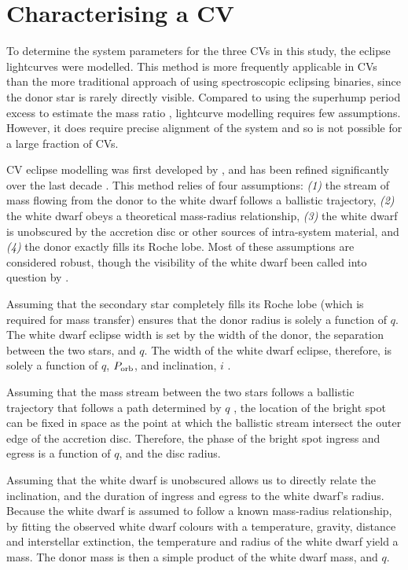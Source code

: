 \section{Characterising a CV}\label{sect:method:lightcurve modelling}

To determine the system parameters for the three CVs in this study, the eclipse lightcurves were modelled. This method is more frequently applicable in CVs than the more traditional approach of using spectroscopic eclipsing binaries, since the donor star is rarely directly visible. Compared to using the superhump period excess to estimate the mass ratio \citep{patterson2005, knigge2006}, lightcurve modelling requires few assumptions. However, it does require precise alignment of the system and so is not possible for a large fraction of CVs.

CV eclipse modelling was first developed by \citet{wood1986}, and has been refined significantly over the last decade \citep{Savoury2011, McAllister2017, McAllister2019}. This method relies of four assumptions: \textit{(1)} the stream of mass flowing from the donor to the white dwarf follows a ballistic trajectory, \textit{(2)} the white dwarf obeys a theoretical mass-radius relationship, \textit{(3)} the white dwarf is unobscured by the accretion disc or other sources of intra-system material, and \textit{(4)} the donor exactly fills its Roche lobe. Most of these assumptions are considered robust, though the visibility of the white dwarf been called into question by \citet{Spark2015}.

Assuming that the secondary star completely fills its Roche lobe (which is required for mass transfer) ensures that the donor radius is solely a function of $q$. The white dwarf eclipse width is set by the width of the donor, the separation between the two stars, and $q$. The width of the white dwarf eclipse, therefore, is solely a function of $q$, $P_{\rm orb}$, and inclination, $i$ \citep{bailey1979}.

Assuming that the mass stream between the two stars follows a ballistic trajectory that follows a path determined by $q$ \citep{Lubow1975}, the location of the bright spot can be fixed in space as the point at which the ballistic stream intersect the outer edge of the accretion disc. Therefore, the phase of the bright spot ingress and egress is a function of $q$, and the disc radius.

Assuming that the white dwarf is unobscured allows us to directly relate the inclination, and the duration of ingress and egress to the white dwarf's radius. Because the white dwarf is assumed to follow a known mass-radius relationship, by fitting the observed white dwarf colours with a temperature, gravity, distance and interstellar extinction, the temperature and radius of the white dwarf yield a mass. The donor mass is then a simple product of the white dwarf mass, and $q$.

